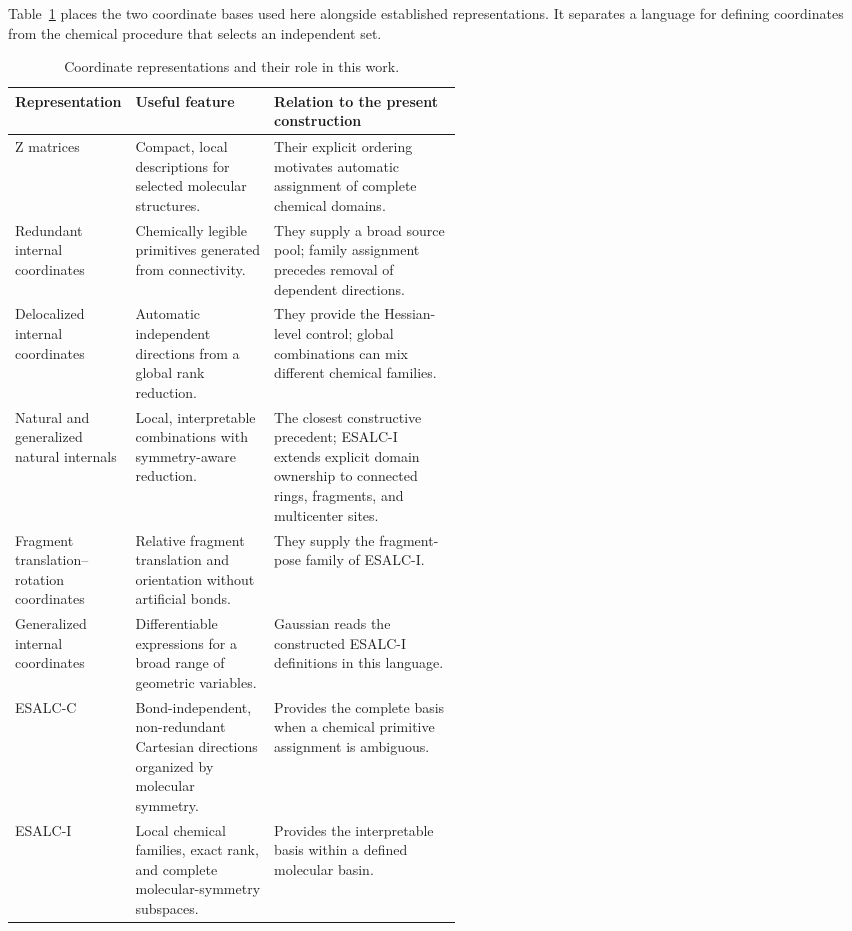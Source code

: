 \documentclass[journal=jctcce,manuscript=article,layout=traditional]{achemso}
\theoremstyle{definition}
\begin{document}
{Table~\ref{tab:coordinate-strategies} places the two
coordinate bases used here alongside established representations. It
separates a language for defining coordinates from the chemical procedure
that selects an independent set.}

\begin{table}[htbp]
\centering
\scriptsize
\setlength{\tabcolsep}{3pt}
\caption{{Coordinate representations and their role in this work.}}
\label{tab:coordinate-strategies}
{
\renewcommand{\arraystretch}{1.08}
\begin{tabularx}{\linewidth}{@{}p{0.21\linewidth}p{0.31\linewidth}X@{}}
\toprule
Representation & Useful feature & Relation to the present construction \\
\midrule
Z matrices & Compact, local descriptions for selected molecular
structures.\cite{BakerHehre1991ZMatrix} &
Their explicit ordering motivates automatic assignment of complete
chemical domains. \\
\midrule
Redundant internal coordinates & Chemically legible primitives generated
from connectivity.\cite{PulayFogarasi1992,Peng1996Redundant,BakkenHelgaker2002,Kudin2001Periodic} &
They supply a broad source pool; family assignment precedes removal of
dependent directions. \\
\midrule
Delocalized internal coordinates & Automatic independent directions from a
global rank reduction.\cite{Baker1996Delocalized,Reveles2006Equivalent} &
They provide the Hessian-level control; global combinations can mix
different chemical families. \\
\midrule
Natural and generalized natural internals & Local, interpretable
combinations with symmetry-aware reduction.\cite{Fogarasi1992Natural,Berces1997NaturalMetal,VonArnimAhlrichs1999GNIC,SwartBickelhaupt2006StrongWeak} &
The closest constructive precedent; ESALC-I extends explicit domain
ownership to connected rings, fragments, and multicenter sites. \\
\midrule
Fragment translation--rotation coordinates & Relative fragment
translation and orientation without artificial bonds.\cite{BilleterTurnerThiel2000HDLC,BakerPulay2000Clusters,WangSong2016GeomeTRIC} &
They supply the fragment-pose family of ESALC-I. \\
\midrule
Generalized internal coordinates & Differentiable expressions for a broad
range of geometric variables.\cite{Marenich2025GIC} &
Gaussian reads the constructed ESALC-I definitions in this language. \\
\midrule
ESALC-C & Bond-independent, non-redundant Cartesian directions organized
by molecular symmetry. &
Provides the complete basis when a chemical primitive assignment is
ambiguous. \\
\midrule
ESALC-I & Local chemical families, exact rank, and complete
molecular-symmetry subspaces. &
Provides the interpretable basis within a defined molecular basin. \\
\bottomrule
\end{tabularx}}
\end{table}
\end{document}
